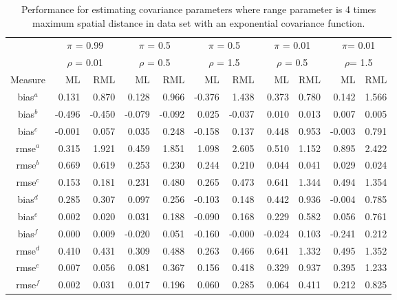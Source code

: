 \documentclass[12pt, titlepage]{article}
\begin{document}
\begin{table}[h]
				\caption{Performance for estimating covariance parameters where range parameter is 4 times maximum spatial distance in data set with an exponential covariance function.}
\begin{center}
\begin{tabular}{c|rr|rr|rr|rr|rr}
  \hline
  \hline
  & \multicolumn{2}{|c|}{$\pi$ = 0.99} & \multicolumn{2}{|c|}{$\pi$ = 0.5}  
  & \multicolumn{2}{|c|}{$\pi$ = 0.5} & \multicolumn{2}{|c}{$\pi$ = 0.01} 
  & \multicolumn{2}{|c}{$\pi$= 0.01} \\
  & \multicolumn{2}{|c|}{$\rho$ = 0.01} & \multicolumn{2}{|c|}{$\rho$ = 0.5}  
  & \multicolumn{2}{|c|}{$\rho$ = 1.5} & \multicolumn{2}{|c}{$\rho$ = 0.5} 
  & \multicolumn{2}{|c}{$\rho$= 1.5} \\
  Measure & ML & RML & ML & RML & ML & RML & ML & RML & ML & RML \\
	\hline
  \hline
bias$^a$ & 0.131 & 0.870 & 0.128 & 0.966 & -0.376 & 1.438 & 0.373 & 0.780 & 0.142 & 1.566 \\ 
  bias$^b$ & -0.496 & -0.450 & -0.079 & -0.092 & 0.025 & -0.037 & 0.010 & 0.013 & 0.007 & 0.005 \\ 
  bias$^c$ & -0.001 & 0.057 & 0.035 & 0.248 & -0.158 & 0.137 & 0.448 & 0.953 & -0.003 & 0.791 \\ 
  rmse$^a$ & 0.315 & 1.921 & 0.459 & 1.851 & 1.098 & 2.605 & 0.510 & 1.152 & 0.895 & 2.422 \\ 
  rmse$^b$ & 0.669 & 0.619 & 0.253 & 0.230 & 0.244 & 0.210 & 0.044 & 0.041 & 0.029 & 0.024 \\ 
  rmse$^c$ & 0.153 & 0.181 & 0.231 & 0.480 & 0.265 & 0.473 & 0.641 & 1.344 & 0.494 & 1.354 \\ 
  bias$^d$ & 0.285 & 0.307 & 0.097 & 0.256 & -0.103 & 0.148 & 0.442 & 0.936 & -0.004 & 0.785 \\ 
  bias$^e$ & 0.002 & 0.020 & 0.031 & 0.188 & -0.090 & 0.168 & 0.229 & 0.582 & 0.056 & 0.761 \\ 
  bias$^f$ & 0.000 & 0.009 & -0.020 & 0.051 & -0.160 & -0.000 & -0.024 & 0.103 & -0.241 & 0.212 \\ 
  rmse$^d$ & 0.410 & 0.431 & 0.309 & 0.488 & 0.263 & 0.466 & 0.641 & 1.332 & 0.495 & 1.352 \\ 
  rmse$^e$ & 0.007 & 0.056 & 0.081 & 0.367 & 0.156 & 0.418 & 0.329 & 0.937 & 0.395 & 1.233 \\ 
  rmse$^f$ & 0.002 & 0.031 & 0.017 & 0.196 & 0.060 & 0.285 & 0.064 & 0.411 & 0.212 & 0.825 \\ 

\end{tabular}
\end{center}
\end{table}
\end{document}
